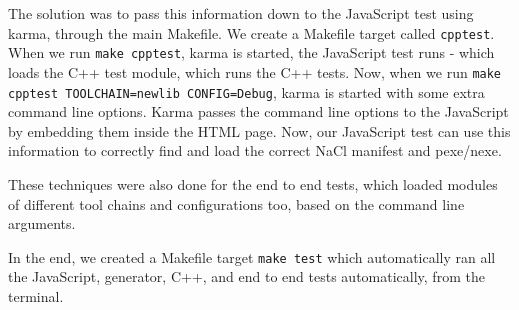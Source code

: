 The solution was to pass this information down to the JavaScript test using karma, through the main Makefile. We create a Makefile target called \lstinline{cpptest}. When we run \lstinline{make cpptest}, karma is started, the JavaScript test runs - which loads the C++ test module, which runs the C++ tests. Now, when we run \lstinline{make cpptest TOOLCHAIN=newlib CONFIG=Debug}, karma is started with some extra command line options. Karma passes the command line options to the JavaScript by embedding them inside the HTML page. Now, our JavaScript test can use this information to correctly find and load the correct NaCl manifest and pexe/nexe.

These techniques were also done for the end to end tests, which loaded modules of different tool chains and configurations too, based on the command line arguments.

In the end, we created a Makefile target \lstinline{make test} which automatically ran all the JavaScript, generator, C++, and end to end tests automatically, from the terminal.

